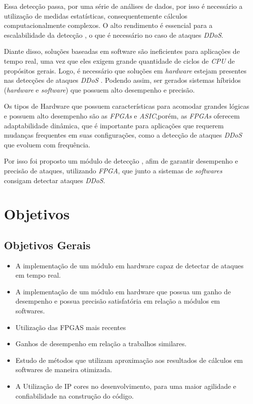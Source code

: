 Essa detecção passa, por uma série de análises de dados, por isso é necessário a utilização de medidas estatísticas, consequentemente cálculos computacionalmente complexos. O alto rendimento é essencial para a escalabilidade da detecção , o que é necessário no caso de ataques \textit{DDoS}.

Diante disso, soluções baseadas em software são ineficientes para aplicações de tempo real, uma vez que eles exigem grande quantidade de ciclos de  \textit{CPU} de propósitos gerais. Logo, é necessário que soluções em \textit{hardware} estejam presentes nas detecções de ataques \textit{DDoS} . Podendo assim, ser gerados sistemas híbridos (\textit{hardware} e \textit{software}) que possuem alto desempenho e precisão.

Os tipos de Hardware que possuem características para acomodar grandes lógicas e possuem alto desempenho são as \textit{FPGAs} e \textit{ASIC},porém, as \textit{FPGAs} oferecem adaptabilidade dinâmica, que é importante para aplicações que requerem mudanças frequentes em suas configurações, como a detecção de ataques \textit{DDoS} que evoluem com frequência. 

Por isso foi proposto um módulo de detecção , afim de garantir desempenho e precisão de ataques, utilizando \textit{FPGA}, que junto a sistemas de  \textit{softwares} consigam detectar ataques  \textit{DDoS}.

\section{Objetivos}
\subsection{Objetivos Gerais}
\begin{itemize}

\item  A implementação de um módulo em hardware capaz de detectar de ataques em tempo real.

\item  A implementação de um módulo em hardware que possua um ganho de desempenho e possua precisão satisfatória em relação a módulos em softwares.

\item Utilização das FPGAS mais recentes 

\item Ganhos de desempenho em relação a trabalhos similares.	

\item  Estudo de métodos que utilizam aproximação aos resultados de cálculos em softwares de maneira otimizada.

\item A Utilização de IP cores no desenvolvimento, para uma maior agilidade e confiabilidade na construção do código. 

\end{itemize}

